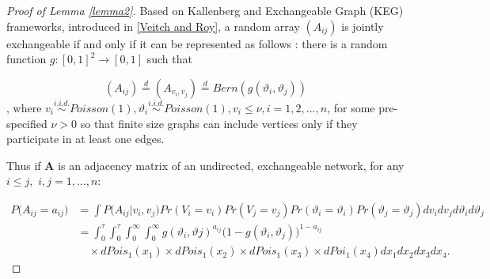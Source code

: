 \documentclass[12pt]{article}
\theoremstyle{definition}
\begin{document}
	
	\begin{proof}[Proof of Lemma \ref{lemma2}]
		Based on Kallenberg and Exchangeable Graph (KEG) frameworks, introduced in \href{http://arxiv.org/abs/1512.03099}{[Veitch and Roy]}, a random array $(A_{ij})$ is jointly exchangeable if and only if it can be represented as follows : there is a random function $g : [0,1]^2 \rightarrow [0,1]$ such that 
		
		\begin{equation}
		(A_{ij})  \stackrel{d}{=} (A_{v_{i}, v_{j}} )  \stackrel{d}{=} Bern( g( \vartheta_{i}, \vartheta_{j}))
		\end{equation}
		, where $v_{i} \overset{i.i.d.}{\sim} Poisson(1), \vartheta_{i} \overset{i.i.d.}{\sim} Poisson(1), v_{i} \leq \nu, i = 1,2,... , n$, for some pre-specified $\nu >0$ so that finite size graphs can include vertices only if they participate in at least one edges. 
		
		Thus if $\mathbf{A}$ is an adjacency matrix of an undirected, exchangeable network, for any $i \leq j,$ $i,j = 1,... , n$:
		
		
		\begin{equation}
		\begin{split}
		P \big(  A_{ij} = a_{ij} \big) & = \int P \big( A_{ij} \big| v_{i}, v_{j} \big) Pr(V_{i} = v_{i}) Pr(V_{j} = v_{j}) Pr(\vartheta_{i} = \vartheta_{i}) Pr(\vartheta_{j} = \vartheta_{j})   dv_{i} dv_{j} d\vartheta_{i} d\vartheta_{j}   \\ & = \int_{0}^{\tau} \int_{0}^{\tau} \int_{0}^{\infty} \int_{0}^{\infty}  g( \vartheta_{i},  \vartheta{j})^{a_{ij}} \big( 1- g( \vartheta_{i},  \vartheta_{j}) \big)^{1-a_{ij}}  \\ & \quad \times dPois_{1}(x_{1}) \times dPois_{1}(x_{2}) \times dPois_{1}(x_{3}) \times dPoi_{1}(x_{4})  dx_{1} dx_{2} dx_{3} dx_{4}.
		\end{split}
		\end{equation}
		
		
		
	\end{proof}
	
\end{document}

